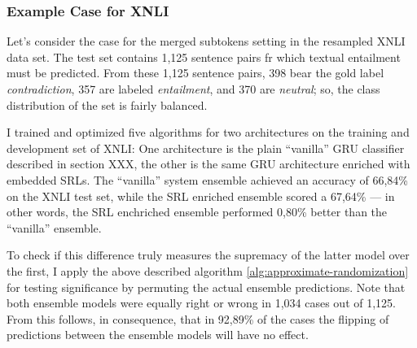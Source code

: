 \subsubsection{Example Case for XNLI}

Let's consider the case for the merged subtokens setting in the resampled XNLI data set. The test
set contains 1,125 sentence pairs fr which textual entailment must be predicted. From these 1,125
sentence pairs, 398 bear the gold label \emph{contradiction}, 357 are labeled \emph{entailment},
and 370 are \emph{neutral}; so, the class distribution of the set is fairly balanced.

I trained and optimized five algorithms for two architectures on the training and development
set of XNLI: One architecture is the plain ``vanilla'' GRU classifier described in section
XXX, the other is the same GRU architecture enriched with embedded SRLs. The ``vanilla''
system ensemble achieved an accuracy of 66,84\% on the XNLI test set, while the SRL enriched
ensemble scored a 67,64\% --- in other words, the SRL enchriched ensemble performed 0,80\%
better than the ``vanilla'' ensemble.

To check if this difference truly measures the supremacy of the latter model over the first, I
apply the above described algorithm \ref{alg:approximate-randomization} for testing significance
by permuting the actual ensemble predictions. Note that both ensemble models were equally
right or wrong in 1,034 cases out of 1,125.  From this follows, in consequence, that in 92,89\%
of the cases the flipping of predictions between the ensemble models will have no effect.


